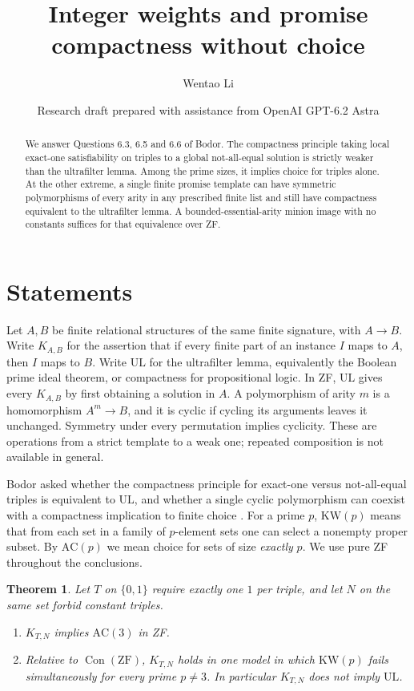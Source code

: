 \documentclass[11pt]{article}
\title{Integer weights and promise compactness without choice}
\author{Wentao Li}
\date{\small Research draft prepared with assistance from OpenAI GPT-6.2 Astra}
\newtheorem{theorem}{Theorem}
\newcommand{\UL}{\mathrm{UL}}
\begin{document}
\maketitle
\begin{abstract}
We answer Questions 6.3, 6.5 and 6.6 of Bodor. The compactness principle taking local exact-one satisfiability on triples to a global not-all-equal solution is strictly weaker than the ultrafilter lemma. Among the prime sizes, it implies choice for triples alone. At the other extreme, a single finite promise template can have symmetric polymorphisms of every arity in any prescribed finite list and still have compactness equivalent to the ultrafilter lemma. A bounded-essential-arity minion image with no constants suffices for that equivalence over ZF.
\end{abstract}

\section{Statements}
Let $A,B$ be finite relational structures of the same finite signature, with $A\to B$. Write $K_{A,B}$ for the assertion that if every finite part of an instance $I$ maps to $A$, then $I$ maps to $B$. Write $\UL$ for the ultrafilter lemma, equivalently the Boolean prime ideal theorem, or compactness for propositional logic. In ZF, $\UL$ gives every $K_{A,B}$ by first obtaining a solution in $A$. A polymorphism of arity $m$ is a homomorphism $A^m\to B$, and it is cyclic if cycling its arguments leaves it unchanged. Symmetry under every permutation implies cyclicity. These are operations from a strict template to a weak one; repeated composition is not available in general.

Bodor asked whether the compactness principle for exact-one versus not-all-equal triples is equivalent to $\UL$, and whether a single cyclic polymorphism can coexist with a compactness implication to finite choice \cite[Questions 6.3, 6.5, 6.6]{bodor}. For a prime $p$, $\mathrm{KW}(p)$ means that from each set in a family of $p$-element sets one can select a nonempty proper subset. By $\mathrm{AC}(p)$ we mean choice for sets of size \emph{exactly} $p$. We use pure ZF throughout the conclusions.

\begin{theorem}\label{promise}
Let $T$ on $\{0,1\}$ require exactly one $1$ per triple, and let $N$ on the same set forbid constant triples.
\begin{enumerate}
\item $K_{T,N}$ implies $\mathrm{AC}(3)$ in ZF.
\item Relative to $\operatorname{Con}(\mathrm{ZF})$, $K_{T,N}$ holds in one model in which $\mathrm{KW}(p)$ fails simultaneously for every prime $p\ne3$. In particular $K_{T,N}$ does not imply $\UL$.
\end{enumerate}
\end{theorem}
\end{document}

